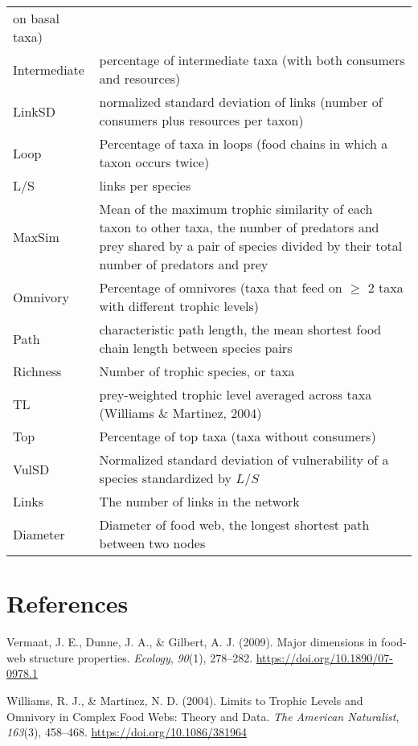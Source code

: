 \documentclass[
]{article}
\newlength{\cslhangindent}
\newenvironment{CSLReferences}[2] %
 {\begin{list}{}{%
  \setlength{\itemindent}{0pt}
  \setlength{\leftmargin}{0pt}
  \setlength{\parsep}{0pt}
  \ifodd #1
   \setlength{\leftmargin}{\cslhangindent}
   \setlength{\itemindent}{-1\cslhangindent}
  \fi
  \setlength{\itemsep}{#2\baselineskip}}}
 {\end{list}}
\begin{document}
\begin{longtable}[]{@{}
  >{\raggedright\arraybackslash}p{}
  >{\raggedright\arraybackslash}p{}@{}}
on basal taxa) \\
Intermediate & percentage of intermediate taxa (with both consumers and
resources) \\
LinkSD & normalized standard deviation of links (number of consumers
plus resources per taxon) \\
Loop & Percentage of taxa in loops (food chains in which a taxon occurs
twice) \\
L/S & links per species \\
MaxSim & Mean of the maximum trophic similarity of each taxon to other
taxa, the number of predators and prey shared by a pair of species
divided by their total number of predators and prey \\
Omnivory & Percentage of omnivores (taxa that feed on \(\geq\) 2 taxa
with different trophic levels) \\
Path & characteristic path length, the mean shortest food chain length
between species pairs \\
Richness & Number of trophic species, or taxa \\
TL & prey-weighted trophic level averaged across taxa (Williams \&
Martinez, 2004) \\
Top & Percentage of top taxa (taxa without consumers) \\
VulSD & Normalized standard deviation of vulnerability of a species
standardized by \(L/S\) \\
Links & The number of links in the network \\
Diameter & Diameter of food web, the longest shortest path between two
nodes \\
\end{longtable}

\section*{References}\label{references}

\label{refs}
\begin{CSLReferences}{1}{0}
Vermaat, J. E., Dunne, J. A., \& Gilbert, A. J. (2009). Major dimensions
in food-web structure properties. \emph{Ecology}, \emph{90}(1),
278--282. \url{https://doi.org/10.1890/07-0978.1}

Williams, R. J., \& Martinez, N. D. (2004). Limits to {Trophic Levels}
and {Omnivory} in {Complex Food Webs}: {Theory} and {Data}. \emph{The
American Naturalist}, \emph{163}(3), 458--468.
\url{https://doi.org/10.1086/381964}

\end{CSLReferences}
\end{document}
